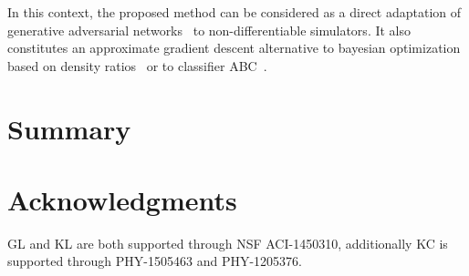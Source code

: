 \documentclass[twocolumn,superscriptaddress,aps]{revtex4-1}
\theoremstyle{plain}
\begin{document}
In this context, the proposed method can be considered as a direct adaptation of
generative adversarial networks~\citep{goodfellow2014generative} to
non-differentiable simulators. It also constitutes an approximate gradient
descent alternative to bayesian optimization based on density
ratios~\citep{cranmer2015approximating} or to classifier
ABC~\citep{gutmann2017likelihood}.



\section{Summary}




\section*{Acknowledgments}

GL and KL are both supported through NSF ACI-1450310, additionally KC is
supported through PHY-1505463 and PHY-1205376.





\end{document}
